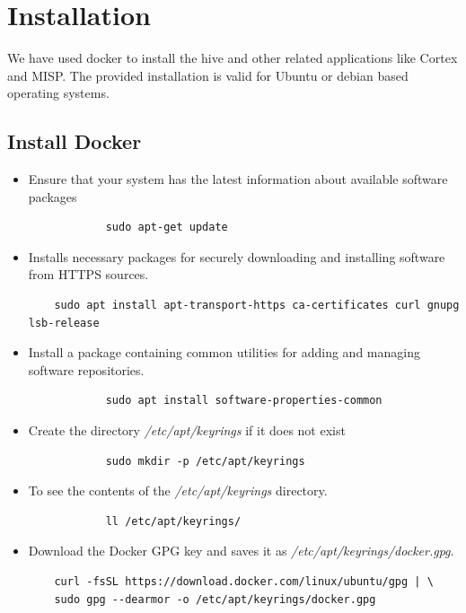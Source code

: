 \documentclass{book}
\begin{document}
\chapter{Installation}
We have used docker to install the hive and other related applications like Cortex and MISP. The provided installation is valid for Ubuntu or debian based operating systems. 

\section{Install Docker}

\begin{itemize}
    \item Ensure that your system has the latest information about available software packages
        \begin{verbatim}
            sudo apt-get update
        \end{verbatim}
    
    \item Installs necessary packages for securely downloading and installing software from HTTPS sources. 
        \begin{verbatim}
    sudo apt install apt-transport-https ca-certificates curl gnupg lsb-release
        \end{verbatim}

    \item Install a package containing common utilities for adding and managing software repositories.
        \begin{verbatim}
            sudo apt install software-properties-common
        \end{verbatim}
    
    \item Create the directory \textit{/etc/apt/keyrings} if it does not exist
        \begin{verbatim}
            sudo mkdir -p /etc/apt/keyrings
        \end{verbatim}
    
    \newpage
    
    \item To see the contents of the \textit{/etc/apt/keyrings} directory.
        \begin{verbatim}
            ll /etc/apt/keyrings/
        \end{verbatim}

    \item Download the Docker GPG key and saves it as \textit{/etc/apt/keyrings/docker.gpg}.
       \begin{verbatim}
    curl -fsSL https://download.docker.com/linux/ubuntu/gpg | \
    sudo gpg --dearmor -o /etc/apt/keyrings/docker.gpg
        \end{verbatim}


\end{itemize}
\end{document}
